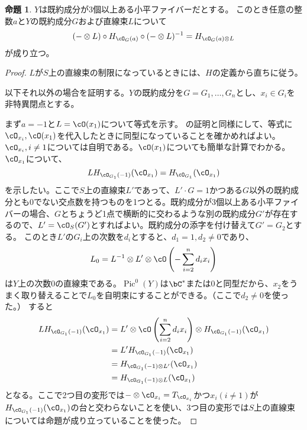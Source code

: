\documentclass[uplatex, a4paper, dvipdfmx]{jsarticle}
\theoremstyle{definition}
\newtheorem{proposition}[theorem]{命題}
\DeclareMathOperator{\Pic}{\mathrm{Pic}}
\begin{document}
\begin{proposition}
    $Y$は既約成分が3個以上ある小平ファイバーだとする。
    このとき任意の整数$a$と$Y$の既約成分$G$および直線束$L$について
    \begin{equation}
        (-\otimes L) \circ H_{\cO_G(a)} \circ(- \otimes L)^{-1} = H_{\cO_G(a)\otimes L}
    \end{equation}
    が成り立つ。
\end{proposition}
\begin{proof}
    $L$が$S$上の直線束の制限になっているときには、$H$の定義から直ちに従う。

    以下それ以外の場合を証明する。$Y$の既約成分を$G = G_1, \dots, G_n$とし、$x_i \in G_i$を非特異閉点とする。

    まず$a=-1$と$L = \cO(x_1)$について等式を示す。
    \cite[Lemma 3.3]{MR3182005}の証明と同様にして、等式に$\cO_{x_i}, \cO(x_1)$を代入したときに同型になっていることを確かめればよい。
    $\cO_{x_i}, i \neq 1$については自明である。$\cO(x_1)$についても簡単な計算でわかる。
    $\cO_{x_1}$について、
    \begin{equation}
        LH_{\cO_{G_1}(-1)}(\cO_{x_1}) = H_{\cO_{G_1}}(\cO_{x_1})
    \end{equation}
    を示したい。ここで$S$上の直線束$L'$であって、$L' \cdot G = 1$かつある$G$以外の既約成分とも$0$でない交点数を持つものを1つとる。既約成分が3個以上ある小平ファイバーの場合、$G$とちょうど1点で横断的に交わるような別の既約成分$G'$が存在するので、$L' = \cO_S(G')$とすればよい。既約成分の添字を付け替えて$G' = G_2$とする。
    このとき$L'$の$G_i$上の次数を$d_i$とすると、$d_1 = 1, d_2 \neq 0$であり、
    \begin{equation}
        L_0=L^{-1} \otimes L' \otimes \cO\left(-\sum_{i = 2}^n d_ix_i\right)
    \end{equation}
    は$Y$上の次数$0$の直線束である。$\Pic^0(Y)$は$\bC^*$または$0$と同型だから、$x_2$をうまく取り替えることで$L_0$を自明束にすることができる。（ここで$d_2 \neq 0$を使った。）
    すると
    \begin{align}
        LH_{\cO_{G_1}(-1)}(\cO_{x_1}) & = L' \otimes\cO\left(\sum_{i = 2}^n d_ix_i\right)\otimes H_{\cO_{G_1}(-1)}(\cO_{x_1}) \\
                                      & =L' H_{\cO_{G_1}(-1)}(\cO_{x_1})                                                      \\
                                      & = H_{\cO_{G_1}(-1)\otimes L'}(\cO_{x_1})                                              \\
                                      & =H_{\cO_{G_1}(-1)\otimes L}(\cO_{x_1})
    \end{align}
    となる。ここで2つ目の変形では$-\otimes \cO_{x_i} = T_{\cO_{x_i}}$かつ$x_i (i \neq 1)$が$H_{\cO_{G_1}(-1)}(\cO_{x_1})$の台と交わらないことを使い、3つ目の変形では$S$上の直線束については命題が成り立っていることを使った。


\end{proof}
\end{document}
